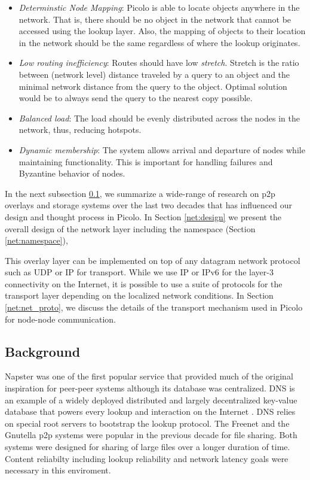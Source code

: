 \begin{itemize}
    \item {\em Determinstic Node Mapping}: Picolo is able to locate objects anywhere in the network. That is, there
        should be no object in the network that cannot be accessed using the lookup layer. Also, the mapping of objects
        to their location in the network should be the same regardless of where the lookup originates.
    \item {\em Low routing inefficiency}: Routes should have low {\em stretch}. Stretch is the ratio between (network
        level) distance traveled by a query to an object and the minimal network distance from the query to the object.
        Optimal solution would be to always send the query to the nearest copy possible.
    \item {\em Balanced load}: The load should be evenly distributed across the nodes in the network, thus, reducing
        hotspots.
    \item {\em Dynamic membership}: The system allows arrival and departure of nodes while maintaining functionality.
        This is important for handling failures and Byzantine behavior of nodes.
\end{itemize}

In the next subsection \ref{net:background}, we summarize a wide-range of research on p2p overlays and storage systems over the last two
decades that has influenced our design and thought process in Picolo. In Section \ref{net:design} we present the overall
design of the network layer including the namespace (Section \ref{net:namespace}), 

This overlay layer can be implemented on top of any datagram network protocol such as UDP or IP for transport. While we
use IP or IPv6 for the layer-3 connectivity on the Internet, it is possible to use a suite of protocols for the
transport layer depending on the localized network conditions. In Section \ref{net:net_proto}, we discuss the details of
the transport mechanism used in Picolo for node-node communication.

\subsection{Background} \label{net:background}

Napster \cite{Napster} was one of the first popular service that provided much of the original inspiration for peer-peer
systems although its database was centralized.  DNS is an example of a widely deployed distributed and largely
decentralized key-value database that powers every lookup and interaction on the Internet \cite{Mockapetris_1988}. DNS
relies on special root servers to bootstrap the lookup protocol. The Freenet \cite{freenet_thesis, Clarke_2001} and the
Gnutella \cite{Gnutella} p2p systems were popular in the previous decade for file sharing. Both systems were designed
for sharing of large files over a longer duration of time. Content reliabilty including lookup reliability and network
latency goals were necessary in this enviroment. 

